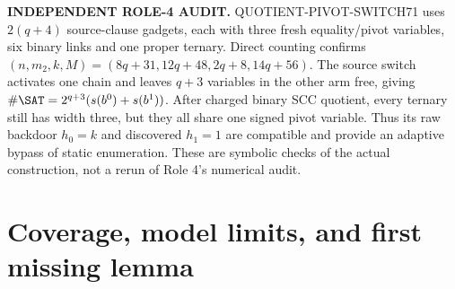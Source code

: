 \documentclass[11pt]{article}
\begin{document}
\textbf{INDEPENDENT ROLE-4 AUDIT.} QUOTIENT-PIVOT-SWITCH71 uses $2(q+4)$ source-clause gadgets, each with three fresh equality/pivot variables, six binary links and one proper ternary. Direct counting confirms $(n,m_2,k,M)=(8q+31,12q+48,2q+8,14q+56)$. The source switch activates one chain and leaves $q+3$ variables in the other arm free, giving $\#\SAT=2^{q+3}(s(b^0)+s(b^1))$. After charged binary SCC quotient, every ternary still has width three, but they all share one signed pivot variable. Thus its raw backdoor $h_0=k$ and discovered $h_1=1$ are compatible and provide an adaptive bypass of static enumeration. These are symbolic checks of the actual construction, not a rerun of Role 4's numerical audit.

\section{Coverage, model limits, and first missing lemma}
\footnotesize\renewcommand{\arraystretch}{1.1}
\end{document}
